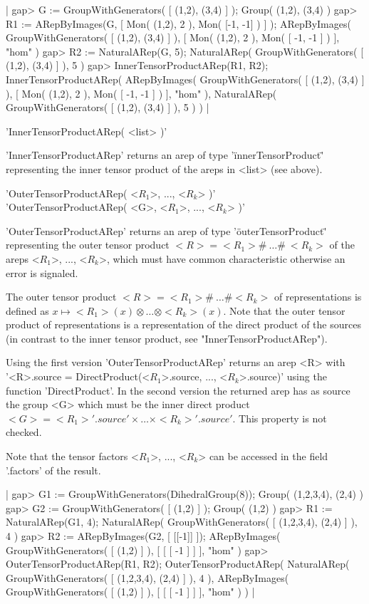 |    gap> G := GroupWithGenerators( [ (1,2), (3,4) ] );
    Group( (1,2), (3,4) )
    gap> R1 := ARepByImages(G, [ Mon( (1,2), 2 ), Mon( [-1, -1] ) ] );
    ARepByImages(
      GroupWithGenerators( [ (1,2), (3,4) ] ),
      [ Mon( (1,2), 2 ), Mon( [ -1, -1 ] ) ],
      "hom"
    )
    gap> R2 := NaturalARep(G, 5);
    NaturalARep( GroupWithGenerators( [ (1,2), (3,4) ] ), 5 )
    gap> InnerTensorProductARep(R1, R2);
    InnerTensorProductARep(
      ARepByImages(
        GroupWithGenerators( [ (1,2), (3,4) ] ),
        [ Mon( (1,2), 2 ), Mon( [ -1, -1 ] ) ],
        "hom"
      ),
      NaturalARep( GroupWithGenerators( [ (1,2), (3,4) ] ), 5 )
    ) |

'InnerTensorProductARep( <list> )'

'InnerTensorProductARep' returns an arep of type 
'\"innerTensorProduct\"' representing
the inner tensor product of the areps in <list> (see above).

'OuterTensorProductARep( <$R_1$>, ..., <$R_k$> )'\\
'OuterTensorProductARep( <G>, <$R_1$>, ..., <$R_k$> )'

'OuterTensorProductARep' returns an arep of type 
'\"outerTensorProduct\"' representing the outer tensor product 
$<R> = <R_1>\#\ \dots\#\ <R_k>$ of the areps <$R_1$>, ..., <$R_k$>, 
which must have common characteristic otherwise an error is 
signaled. 

The outer tensor product $<R> = <R_1>\#\ \dots\# <R_k>$ of 
representations is
defined as $x\mapsto <R_1>(x)\otimes\dots\otimes <R_k>(x)$.
Note that the outer tensor product of representations 
is a representation of the direct product of the sources 
(in contrast to the inner tensor product, see "InnerTensorProductARep").

Using the first version 'OuterTensorProductARep' returns an arep <R> with
'<R>.source = DirectProduct(<$R_1$>.source, ..., <$R_k$>.source)' 
using the {\GAP} function 'DirectProduct'. In the second version
the returned arep has as source the group <G> which must be the inner 
direct product $<G> = <R_1>'.source'\times\dots\times<R_k>'.source'$. 
This property is not checked. 

Note that the tensor factors <$R_1$>, ..., <$R_k$> can be accessed 
in the field '.factors' of the result.

|    gap> G1 := GroupWithGenerators(DihedralGroup(8));
    Group( (1,2,3,4), (2,4) )
    gap> G2 := GroupWithGenerators( [ (1,2) ] );
    Group( (1,2) )
    gap> R1 := NaturalARep(G1, 4);
    NaturalARep( GroupWithGenerators( [ (1,2,3,4), (2,4) ] ), 4 )
    gap> R2 := ARepByImages(G2, [ [[-1]] ]);
    ARepByImages(
      GroupWithGenerators( [ (1,2) ] ),
      [ [ [ -1 ] ] ],
      "hom"
    )
    gap> OuterTensorProductARep(R1, R2);
    OuterTensorProductARep(
      NaturalARep( GroupWithGenerators( [ (1,2,3,4), (2,4) ] ), 4 ),
      ARepByImages(
        GroupWithGenerators( [ (1,2) ] ),
        [ [ [ -1 ] ] ],
        "hom"
      )
    ) |

